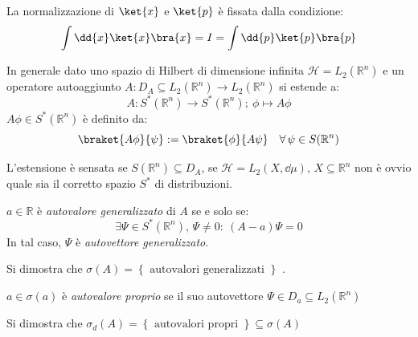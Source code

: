 \begin{remark}
    La normalizzazione di \(\ket{x}\) e \(\ket{p}\) è fissata dalla condizione:
    \begin{equation}
        \int \dd{x} \ket{x}\bra{x} = I = \int \dd{p} \ket{p}\bra{p}
    \end{equation}

\end{remark}

In generale dato uno spazio di Hilbert di dimensione infinita \(\mathcal{H}= L_2(\mathbb{R}^n)\) e un operatore autoaggiunto \(A: D_A \subseteq L_2(\mathbb{R}^n)\to L_2(\mathbb{R}^n)\)
si estende a:
\begin{equation}
    A: S^*(\mathbb{R}^n)\to S^*(\mathbb{R}^n) ; \ \phi \mapsto A\phi
\end{equation}
\(A\phi \in S^*(\mathbb{R}^n)\) è definito da:
\[
    \braket{A\phi}{\psi}:=\braket{\phi}{A\psi} \quad \forall\, \psi \in S(\mathbb{R}^n)
\]
\begin{attention}
    L'estensione è sensata se \(S(\mathbb{R}^n)\subseteq D_A\), se \(\mathcal{H}= L_2(X, \dd{\mu}), \, X \subseteq \mathbb{R}^n \) non è ovvio 
    quale sia il corretto spazio \(S^*\) di distribuzioni.
\end{attention}
\begin{definition}
    \(a \in \mathbb{R}\) è \textit{autovalore generalizzato} di \(A\) se e solo se:
    \[
        \exists\Psi \in S^*(\mathbb{R}^n), \,\Psi\neq 0 : \ (A-a)\Psi= 0
    \]
    In tal caso, \(\Psi\) è \textit{autovettore generalizzato}.
\end{definition}

Si dimostra che \(\sigma(A) = \left\{ \text{ autovalori generalizzati } \right\}\) .
\begin{definition}
    \(a \in \sigma(a)\) è \textit{autovalore proprio} se il suo autovettore \(\Psi \in D_a\subseteq L_2(\mathbb{R}^n)\)
\end{definition}

Si dimostra che \(\sigma_d(A)= \left\{ \text{ autovalori propri } \right\} \subseteq \sigma(A)\)

